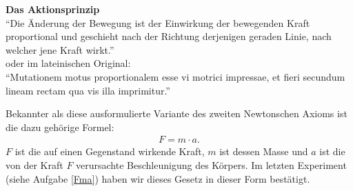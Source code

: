 \newpage

\begin{cbox}\label{newton2}
	\textbf{Das Aktionsprinzip}\\
``Die Änderung der Bewegung ist der Einwirkung der bewegenden Kraft proportional und geschieht nach der Richtung derjenigen geraden Linie, nach welcher jene Kraft wirkt.''
	\\oder im lateinischen Original:\\
``Mutationem motus proportionalem esse vi motrici impressae, et fieri secundum lineam rectam qua vis illa imprimitur.''
\end{cbox}

Bekannter als diese ausformulierte Variante des zweiten Newtonschen Axioms ist die dazu gehörige Formel:
\begin{eqnarray*}
	F=m\cdot a\text{.}
\end{eqnarray*}
$F$ ist die auf einen Gegenstand wirkende Kraft, $m$ ist dessen Masse und $a$ ist die von der Kraft $F$ verursachte Beschleunigung des Körpers.
Im letzten Experiment (siehe Aufgabe \ref{Fma}) haben wir dieses Gesetz in dieser Form bestätigt.




